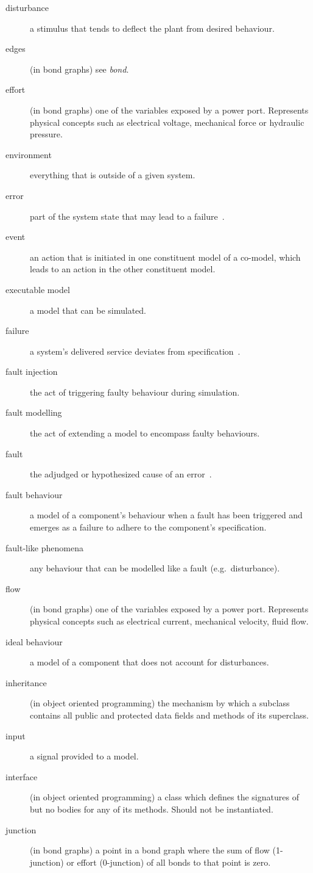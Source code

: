 \documentclass{crescendorepchap}
\begin{document}
\begin{description}
\item[disturbance] a stimulus that tends to deflect the plant from desired behaviour.
\item[edges] (in bond graphs) see \textit{bond}.
\item[effort] (in bond graphs) one of the variables exposed by a power port.  Represents physical concepts such as electrical voltage, mechanical force or hydraulic pressure.
\item[environment] everything that is outside of a given system.
\item[error] part of the system state that may lead to a failure~\cite{Avizienis&04}.
\item[event] an action that is initiated in one constituent model of a co-model, which leads to an action in the other constituent model.
\item[executable model] a model that can be simulated.
\item[failure] a system's delivered service deviates from specification~\cite{Avizienis&04}.
\item[fault injection] the act of triggering faulty behaviour during simulation.
\item[fault modelling] the act of extending a model to encompass faulty behaviours.
\item[fault] the adjudged or hypothesized cause of an error~\cite{Avizienis&04}.
\item[fault behaviour] a model of a component's behaviour when a fault has been triggered and emerges as a failure to adhere to the component's specification.
\item[fault-like phenomena] any behaviour that can be modelled like a fault (e.g.\ disturbance).
\item[flow] (in bond graphs) one of the variables exposed by a power port.  Represents physical concepts such as electrical current, mechanical velocity, fluid flow.
\item[ideal behaviour] a model of a component that does not account for disturbances.
\item[inheritance] (in object oriented programming) the mechanism by which a subclass contains all public and protected data fields and methods of its superclass.
\item[input] a signal provided to a model.
\item[interface] (in object oriented programming) a class which defines the signatures of but no bodies for any of its methods.  Should not be instantiated.
\item[junction] (in bond graphs) a point in a bond graph where the sum of flow (1-junction) or effort (0-junction) of all bonds to that point is zero.

\end{description}
\end{document}
